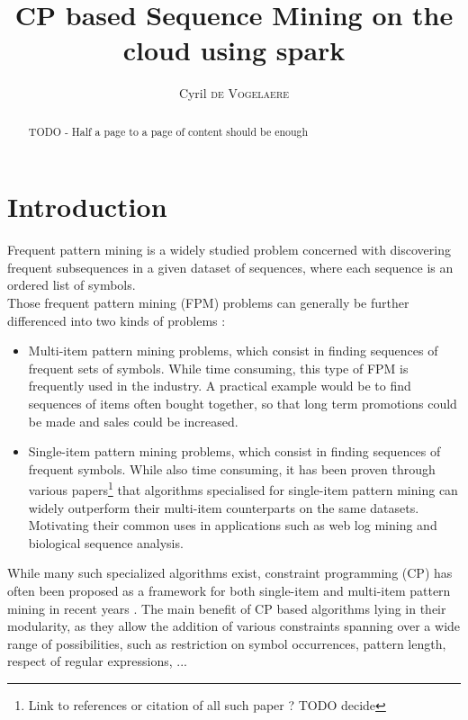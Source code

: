 \documentclass{eplmastersthesis}
\title{CP based Sequence Mining on the cloud using spark}	%
\author{Cyril \textsc{de Vogelaere}}	%
\begin{document}
\begin{singlespacing}
\maketitle					%
\end{singlespacing}

\tableofcontents
\newpage
\listoffigures
\listoftables
\newpage

\begin{abstract}
TODO - Half a page to a page of content should be enough
\end{abstract}
\newpage


\section{Introduction}

Frequent pattern mining is a widely studied problem concerned with discovering frequent subsequences in a given dataset of sequences, where each sequence is an ordered list of symbols. \\
Those frequent pattern mining (FPM) problems can generally be further differenced into two kinds of problems :

\begin{itemize}
\item Multi-item pattern mining problems, which consist in finding sequences of frequent sets of symbols. While time consuming, this type of FPM is frequently used in the industry. A practical example would be to find sequences of items often bought together, so that long term promotions could be made and sales could be increased.
\item Single-item pattern mining problems, which consist in finding sequences of frequent symbols. While also time consuming, it has been proven through various papers\footnote{Link to references or citation of all such paper ? TODO decide} that algorithms specialised for single-item pattern mining can widely outperform their multi-item counterparts on the same datasets. Motivating their common uses in applications such as web log mining and biological sequence analysis.
\end{itemize}

While many such specialized algorithms exist, constraint programming (CP) has often been proposed as a framework for both single-item and multi-item pattern mining in recent years \cite{CPforDataMining, CPforItemSetMining}. The main benefit of CP based algorithms lying in their modularity, as they allow the addition of various constraints spanning over a wide range of possibilities, such as restriction on symbol occurrences, pattern length, respect of regular expressions, ... \newline
\end{document}
